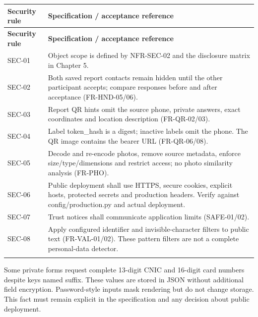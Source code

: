 \documentclass[12pt,a4paper,oneside]{report}
\begin{document}
\begin{longtable}{@{}P{0.19\dimexpr\textwidth-12pt\relax}P{0.81\dimexpr\textwidth-12pt\relax}@{}}

\toprule \textbf{Security rule} & \textbf{Specification / acceptance reference} \\ \midrule\endfirsthead

\toprule \textbf{Security rule} & \textbf{Specification / acceptance reference} \\ \midrule\endhead

\bottomrule\endfoot

SEC-01 & Object scope is defined by NFR-SEC-02 and the disclosure matrix in Chapter 5. \\ \addlinespace[3pt]

SEC-02 & Both saved report contacts remain hidden until the other participant accepts; compare responses before and after acceptance (FR-HND-05/06). \\ \addlinespace[3pt]

SEC-03 & Report QR hints omit the source phone, private answers, exact coordinates and location description (FR-QR-02/03). \\ \addlinespace[3pt]

SEC-04 & Label token\_hash is a digest; inactive labels omit the phone. The QR image contains the bearer URL (FR-QR-06/08). \\ \addlinespace[3pt]

SEC-05 & Decode and re-encode photos, remove source metadata, enforce size/type/dimensions and restrict access; no photo similarity analysis (FR-PHO). \\ \addlinespace[3pt]

SEC-06 & Public deployment shall use HTTPS, secure cookies, explicit hosts, protected secrets and production headers. Verify against config/production.py and actual deployment. \\ \addlinespace[3pt]

SEC-07 & Trust notices shall communicate application limits (SAFE-01/02). \\ \addlinespace[3pt]

SEC-08 & Apply configured identifier and invisible-character filters to public text (FR-VAL-01/02). These pattern filters are not a complete personal-data detector. \\ \addlinespace[3pt]

\end{longtable}

Some private forms request complete 13-digit CNIC and 16-digit card numbers despite keys named suffix. These values are stored in JSON without additional field encryption. Password-style inputs mask rendering but do not change storage. This fact must remain explicit in the specification and any decision about public deployment.
\end{document}
